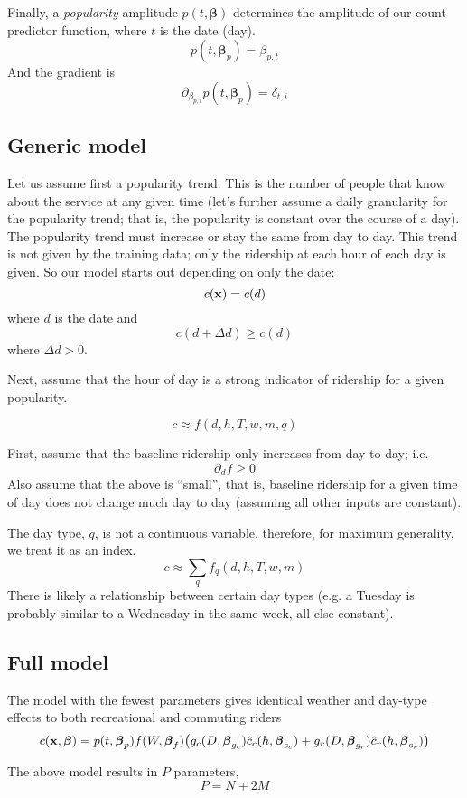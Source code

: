 \documentclass{article}
\newcommand{\bx}{{\bf x}}
\newcommand{\bbeta}{\boldsymbol\beta}
\begin{document}
Finally, a {\it popularity} amplitude $p(t, \bbeta)$ determines the amplitude of our
count predictor function, where $t$ is the date (day).
\[
p(t, \bbeta_p) = \beta_{p,t}
\]
And the gradient is
\[
\partial_{\beta_{p,i}} p(t, \bbeta_p) = \delta_{t,i}
\]


\subsection*{Generic model}

Let us assume first a popularity trend. This is the number of people
that know about the service at any given time (let's further assume
a daily granularity for the popularity trend; that is, the popularity
is constant over the course of a day). The popularity trend must
increase or stay the same from day to day. This trend is not given by
the training data; only the ridership at each hour of each day is
given. So our model starts out depending on only the date:
\[
c(\bx) = c(d)
\]
where $d$ is the date and
\[
c(d + \Delta d) \geq c(d)
\]
where $\Delta d > 0$.

Next, assume that the hour of day is a strong indicator of ridership
for a given popularity.

\[
c \approx f(d, h, T, w, m, q)
\]

First, assume that the baseline ridership only increases from day to
day; i.e.
\[
\partial_d f \geq 0
\]
Also assume that the above is ``small'', that is, baseline ridership
for a given time of day does not change much day to day (assuming all
other inputs are constant).

The day type, $q$, is not a continuous variable, therefore, for
maximum generality, we treat it
as an index.
\[
c \approx \sum_q f_q(d, h, T, w, m)
\]
There is likely a relationship between certain day types (e.g. a
Tuesday is probably similar to a Wednesday in the same week, all else
constant).



\subsection*{Full model}

The model with the fewest parameters gives identical weather and
day-type effects to both recreational and commuting riders
\[
c(\bx, \bbeta) = p(t, \bbeta_p) f(W, \bbeta_f)
\big( g_c(D, \bbeta_{g_c}) \hat{c}_c(h, \bbeta_{c_c}) + g_r(D,
\bbeta_{g_r}) \hat{c}_r(h, \bbeta_{c_r}) \big)
\]

The above model results in $P$ parameters,
\[
P = N + 2 M
\]
\end{document}

